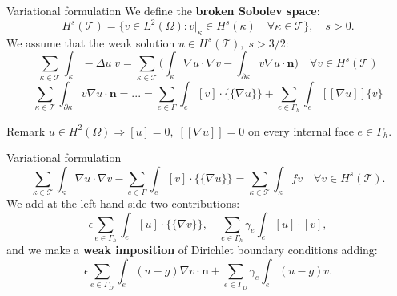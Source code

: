 \documentclass{beamer}
\begin{document}
\begin{frame}{Variational formulation}
	We define the \textbf{broken Sobolev space}:
	\begin{equation*}
		H^s(\mathcal{T}) = \{ v \in L^2(\Omega) : v|_\kappa \in H^s(\kappa)
		\quad \forall \kappa \in \mathcal{T} \}, \quad s>0.
	\end{equation*}
	We assume that the weak solution $u \in H^s(\mathcal{T}), \; s>3/2$:
	\begin{equation*}
		\sum_{\kappa \in \mathcal{T}} \int_\kappa -\Delta u \; v
		= \sum_{\kappa \in \mathcal{T}} \bigg( \int_\kappa \nabla u \cdot
		\nabla v
		- \int_{\partial \kappa} v \nabla u \cdot \mathbf{n} \bigg) \quad
		\forall v
		\in H^s(\mathcal{T})
	\end{equation*}
	\begin{equation*}
			\sum_{\kappa \in \mathcal{T}} \int_{\partial \kappa} v \nabla u
			\cdot \mathbf{n} = ... = \sum_{e \in \Gamma} \int_e [v]
			\cdot
			\{\!\!\{
			\nabla u \}\!\!\} + \sum_{e \in \Gamma_h} \int_e [\![
			\nabla u ]\!] \{v\}
	\end{equation*}
	\begin{block}{Remark}
		$u \in H^2(\Omega) \Rightarrow [u] = 0, \; [\![\nabla u]\!] = 0 $ 
		on every internal face $e \in \Gamma_h$.
	\end{block}
\end{frame}
\begin{frame}{Variational formulation}
	\begin{equation*}
	\sum_{\kappa \in \mathcal{T}} \int_\kappa \nabla u \cdot \nabla v -
	\sum_{e \in \Gamma} \int_e [v] \cdot \{\!\!\{ \nabla u \}\!\!\} =
	\sum_{\kappa \in \mathcal{T}} \int_\kappa fv \quad \forall v \in 
	H^s(\mathcal{T}).
	\end{equation*}
	We add at the left hand side two contributions:
	\begin{equation*}
		\epsilon \sum_{e \in \Gamma_h} \int_e [u] \cdot \{\!\!\{ \nabla v
		\}\!\!\}, \quad \sum_{e \in \Gamma_h} \gamma_e \int_e [u] \cdot [v],
	\end{equation*}
	and we make a \textbf{weak imposition} of Dirichlet boundary conditions 
	adding:
	\begin{equation*}
	\epsilon \sum_{e \in \Gamma_D} \int_e (u-g) \nabla v \cdot \mathbf{n}
	+ \sum_{e \in \Gamma_D} \gamma_e \int_e (u-g)v.
	\end{equation*}
\end{frame}
\end{document}
